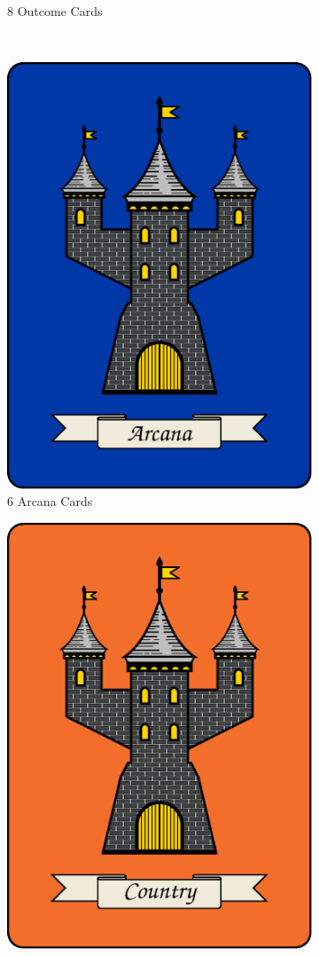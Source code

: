 \documentclass[10pt, parskip=half-, twoside]{scrartcl}
\begin{document}
\begin{itemize}[itemindent=*, leftmargin=*]
\begin{figure}[H]
\begin{subfigure}{0.4\textwidth}
	\caption*{8 Outcome Cards}
	\end{subfigure}
	\\[1em]
	\begin{subfigure}{0.4\textwidth}
	\centering
		\includegraphics[scale=0.1]{Images/arcana_card_back.pdf}
	\caption*{6 Arcana Cards}
	\end{subfigure}
	\qquad
	\begin{subfigure}{0.4\textwidth}
	\centering
		\includegraphics[scale=0.1]{Images/country_card_back.pdf}

\end{subfigure}
\end{figure}
\end{itemize}
\end{document}
